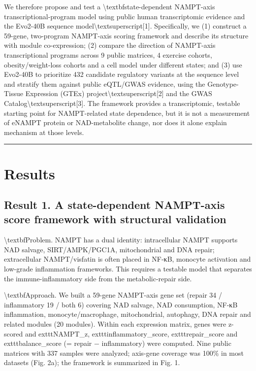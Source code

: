 \documentclass[11pt]{article}
\begin{document}
We therefore propose and test a \textbackslash{}textbf{state-dependent NAMPT-axis transcriptional-program model} using public human transcriptomic evidence and the Evo2-40B sequence model\textbackslash{}textsuperscript{[1]}. Specifically, we (1) construct a 59-gene, two-program NAMPT-axis scoring framework and describe its structure with module co-expression; (2) compare the direction of NAMPT-axis transcriptional programs across 9 public matrices, 4 exercise cohorts, obesity/weight-loss cohorts and a cell model under different states; and (3) use Evo2-40B to prioritize 432 candidate regulatory variants at the sequence level and stratify them against public eQTL/GWAS evidence, using the Genotype-Tissue Expression (GTEx) project\textbackslash{}textsuperscript{[2]} and the GWAS Catalog\textbackslash{}textsuperscript{[3]}. The framework provides a transcriptomic, testable starting point for NAMPT-related state dependence, but it is not a measurement of eNAMPT protein or NAD-metabolite change, nor does it alone explain mechanism at those levels.

\vspace{4pt}\hrule\vspace{8pt}
\section*{Results}
\subsection*{Result 1. A state-dependent NAMPT-axis score framework with structural validation}
\textbackslash{}textbf{Problem.} NAMPT has a dual identity: intracellular NAMPT supports NAD salvage, SIRT/AMPK/PGC1A, mitochondrial and DNA repair; extracellular NAMPT/visfatin is often placed in NF-κB, monocyte activation and low-grade inflammation frameworks. This requires a testable model that separates the immune-inflammatory side from the metabolic-repair side.

\textbackslash{}textbf{Approach.} We built a 59-gene NAMPT-axis gene set (repair 34 / inflammatory 19 / both 6) covering NAD salvage, NAD consumption, NF-κB inflammation, monocyte/macrophage, mitochondrial, autophagy, DNA repair and related modules (20 modules). Within each expression matrix, genes were z-scored and 	exttt{NAMPT\_z}, 	exttt{inflammatory\_score}, 	exttt{repair\_score} and 	exttt{balance\_score} (= repair − inflammatory) were computed. Nine public matrices with 337 samples were analyzed; axis-gene coverage was 100\% in most datasets (Fig. 2a); the framework is summarized in Fig. 1.
\end{document}
